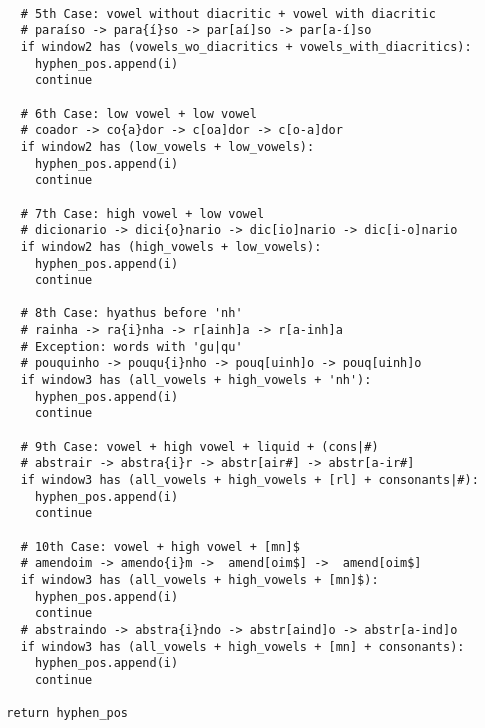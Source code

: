 \footnotesize
\begin{verbatim}
  
    # 5th Case: vowel without diacritic + vowel with diacritic
    # paraíso -> para{í}so -> par[aí]so -> par[a-í]so
    if window2 has (vowels_wo_diacritics + vowels_with_diacritics):
      hyphen_pos.append(i)
      continue
    
    # 6th Case: low vowel + low vowel
    # coador -> co{a}dor -> c[oa]dor -> c[o-a]dor
    if window2 has (low_vowels + low_vowels):
      hyphen_pos.append(i)
      continue
    
    # 7th Case: high vowel + low vowel
    # dicionario -> dici{o}nario -> dic[io]nario -> dic[i-o]nario 
    if window2 has (high_vowels + low_vowels):
      hyphen_pos.append(i)
      continue
    
    # 8th Case: hyathus before 'nh'
    # rainha -> ra{i}nha -> r[ainh]a -> r[a-inh]a
    # Exception: words with 'gu|qu'
    # pouquinho -> pouqu{i}nho -> pouq[uinh]o -> pouq[uinh]o
    if window3 has (all_vowels + high_vowels + 'nh'):
      hyphen_pos.append(i)
      continue

    # 9th Case: vowel + high vowel + liquid + (cons|#)
    # abstrair -> abstra{i}r -> abstr[air#] -> abstr[a-ir#]
    if window3 has (all_vowels + high_vowels + [rl] + consonants|#):
      hyphen_pos.append(i)
      continue
    
    # 10th Case: vowel + high vowel + [mn]$
    # amendoim -> amendo{i}m ->  amend[oim$] ->  amend[oim$]    
    if window3 has (all_vowels + high_vowels + [mn]$):
      hyphen_pos.append(i)
      continue
    # abstraindo -> abstra{i}ndo -> abstr[aind]o -> abstr[a-ind]o 
    if window3 has (all_vowels + high_vowels + [mn] + consonants):
      hyphen_pos.append(i)
      continue
    
  return hyphen_pos
\end{verbatim}
